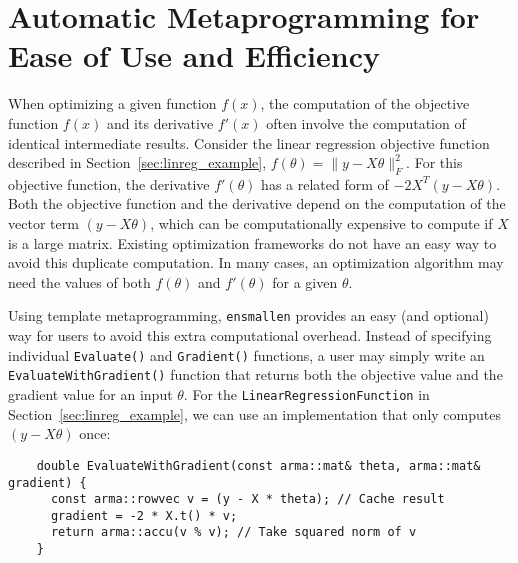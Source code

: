 \documentclass{article}
\begin{document}
\vspace*{-0.3em}
\section{Automatic Metaprogramming for Ease of Use and Efficiency}
\vspace*{-0.5em}

When optimizing a given function $f(x)$, the computation of
the objective function $f(x)$ and its derivative $f'(x)$ often involve the
computation of identical intermediate results.  Consider the linear regression
objective function described
in Section~\ref{sec:linreg_example}, $f(\theta) = \| y - X\theta \|_F^2$.
For this objective function, the derivative $f'(\theta)$ has a related form of
$-2 X^T (y -X \theta)$.  Both the objective function and the derivative 
depend on the computation of the vector term $(y - X \theta)$,
which can be computationally expensive to compute if $X$ is a large matrix.
Existing optimization frameworks do not have an easy way to avoid
this duplicate computation. In many cases, an optimization algorithm
may need the values of both $f(\theta)$ and $f'(\theta)$ for a given $\theta$.

Using template metaprogramming, {\tt ensmallen} provides an easy (and
optional) way for users to avoid this extra computational overhead.  Instead of
specifying individual {\tt Evaluate()} and {\tt Gradient()} functions, a user
may simply write an {\tt EvaluateWithGradient()} function that returns both the
objective value and the gradient value for an input $\theta$.  For the 
\texttt{LinearRegressionFunction} in Section~\ref{sec:linreg_example},
we can use an implementation that only computes $(y - X \theta)$ once:

\vspace*{-0.5em}
\begin{verbatim}
    double EvaluateWithGradient(const arma::mat& theta, arma::mat& gradient) {
      const arma::rowvec v = (y - X * theta); // Cache result
      gradient = -2 * X.t() * v;
      return arma::accu(v % v); // Take squared norm of v
    }
\end{verbatim}
\vspace*{-0.5em}
\end{document}
